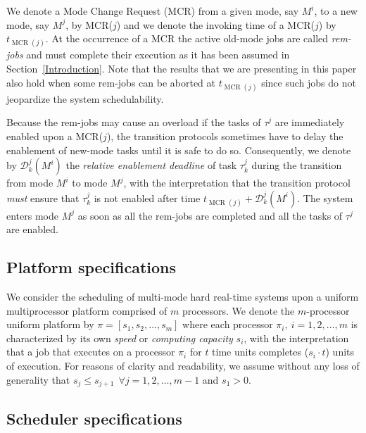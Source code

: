 \documentclass[10pt,english,a4paper]{article}
\newtheorem{validity test}{Validity Test}
\begin{document}
We denote a Mode Change Request (MCR) from a given mode, say $M^i$, to a new mode, say $M^j$, by MCR($j$) and we denote the invoking time of a MCR($j$) by $t_{\operatorname{MCR}(j)}$. At the occurrence of a MCR the active old-mode jobs are called {\em rem-jobs} and must complete their execution as it has been assumed in Section~\ref{Introduction}. Note that the results that we are presenting in this paper also hold when some rem-jobs can be aborted at $t_{\operatorname{MCR}(j)}$ since such jobs do not jeopardize the system schedulability. 

Because the rem-jobs may cause an overload if the tasks of $\tau^j$ are immediately enabled upon a MCR($j$), the transition protocols sometimes have to delay the enablement of new-mode tasks until it is safe to do so. Consequently, we denote by $\mathcal{D}^j_k(M^i)$ the {\em relative enablement deadline} of task $\tau_k^j$ during the transition from mode $M^i$ to mode $M^j$, with the interpretation that the transition protocol {\em must} ensure that $\tau_k^j$ is not enabled after time $t_{\operatorname{MCR}(j)} + \mathcal{D}^j_k(M^i)$. The system enters mode $M^j$ as soon as all the rem-jobs are completed and all the tasks of $\tau^j$ are enabled.

\subsection{Platform specifications}

We consider the scheduling of multi-mode hard real-time systems upon a uniform multiprocessor platform comprised of $m$ processors. We denote the $m$-processor uniform platform by $\pi = [s_1, s_2, \ldots, s_m]$ where each processor $\pi_i, \: i = 1, 2, \ldots, m$ is characterized by its own {\em speed} or {\em computing capacity} $s_i$, with the interpretation that a job that executes on a processor $\pi_i$ for $t$ time units completes ($s_i \cdot t$) units of execution. For reasons of clarity and readability, we assume without any loss of generality that $s_j \le s_{j+1} \:\: \forall j = 1, 2, \ldots, m-1$ and $s_1 > 0$.

\subsection{Scheduler specifications}
\label{sec:scheduler_specs}
\end{document}
